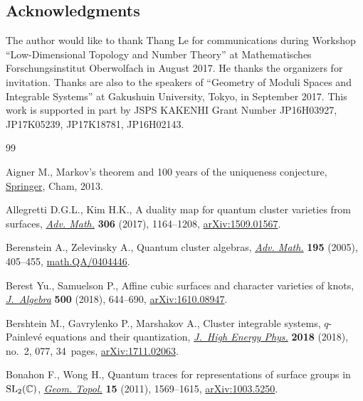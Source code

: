 \documentclass[10pt,a4paper]{amsart}
\numberwithin{equation}{section}
\begin{document}
\subsection*{Acknowledgments}
The author would like to thank Thang Le for communications during Workshop ``Low-Dimen\-sional Topology and Number Theory'' at Mathematisches Forschungsinstitut Oberwolfach in August 2017. He thanks the organizers for invitation. Thanks are also to the speakers of ``Geo\-metry of Moduli Spaces and Integrable Systems'' at Gakushuin University, Tokyo, in September 2017. This work is supported in part by JSPS KAKENHI Grant Number JP16H03927,
JP17K05239, JP17K18781, JP16H02143.



\begin{thebibliography}{99}
\footnotesize\itemsep=0pt

Aigner M., Markov's theorem and 100 years of the uniqueness conjecture,
 \href{https://doi.org/10.1007/978-3-319-00888-2}{Springer}, Cham, 2013.

Allegretti D.G.L., Kim H.K., A duality map for quantum cluster varieties from
 surfaces, \href{https://doi.org/10.1016/j.aim.2016.11.007}{\textit{Adv. Math.}} \textbf{306} (2017), 1164--1208,
 \href{https://arxiv.org/abs/1509.01567}{arXiv:1509.01567}.

Berenstein A., Zelevinsky A., Quantum cluster algebras, \href{https://doi.org/10.1016/j.aim.2004.08.003}{\textit{Adv. Math.}}
 \textbf{195} (2005), 405--455, \href{https://arxiv.org/abs/math.QA/0404446}{math.QA/0404446}.

Berest Yu., Samuelson P., Affine cubic surfaces and character varieties of
 knots, \href{https://doi.org/10.1016/j.jalgebra.2017.11.015}{\textit{J.~Algebra}} \textbf{500} (2018), 644--690,
 \href{https://arxiv.org/abs/1610.08947}{arXiv:1610.08947}.

Bershtein M., Gavrylenko P., Marshakov A., Cluster integrable systems,
 {$q$}-{P}ainlev\'{e} equations and their quantization, \href{https://doi.org/10.1007/jhep02(2018)077}{\textit{J.~High Energy
 Phys.}} \textbf{2018} (2018), no.~2, 077, 34~pages, \href{https://arxiv.org/abs/1711.02063}{arXiv:1711.02063}.

Bonahon F., Wong H., Quantum traces for representations of surface groups in
 {${\rm SL}_2(\mathbb C)$}, \href{https://doi.org/10.2140/gt.2011.15.1569}{\textit{Geom. Topol.}} \textbf{15} (2011),
 1569--1615, \href{https://arxiv.org/abs/1003.5250}{arXiv:1003.5250}.


\end{thebibliography}
\end{document}
